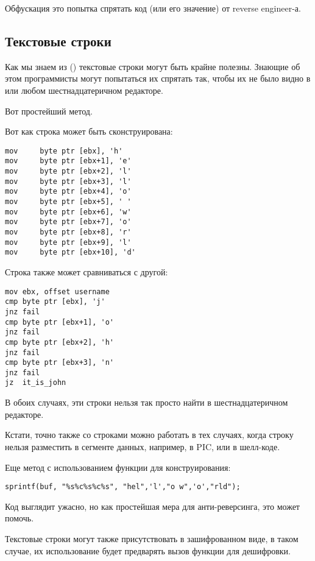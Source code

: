 
Обфускация это попытка спрятать код (или его значение) от reverse engineer-а.

\subsection{Текстовые строки}

Как мы знаем из () текстовые строки могут быть крайне
полезны.
Знающие об этом программисты могут попытаться их спрятать так, чтобы их не было видно в \IDA{} или любом
шестнадцатеричном редакторе.

Вот простейший метод.

Вот как строка может быть сконструирована:

\begin{lstlisting}[style=customasmx86]
mov     byte ptr [ebx], 'h'
mov     byte ptr [ebx+1], 'e'
mov     byte ptr [ebx+2], 'l'
mov     byte ptr [ebx+3], 'l'
mov     byte ptr [ebx+4], 'o'
mov     byte ptr [ebx+5], ' '
mov     byte ptr [ebx+6], 'w'
mov     byte ptr [ebx+7], 'o'
mov     byte ptr [ebx+8], 'r'
mov     byte ptr [ebx+9], 'l'
mov     byte ptr [ebx+10], 'd'
\end{lstlisting}

Строка также может сравниваться с другой:

\begin{lstlisting}[style=customasmx86]
mov	ebx, offset username
cmp	byte ptr [ebx], 'j'
jnz	fail
cmp	byte ptr [ebx+1], 'o'
jnz	fail
cmp	byte ptr [ebx+2], 'h'
jnz	fail
cmp	byte ptr [ebx+3], 'n'
jnz	fail
jz	it_is_john
\end{lstlisting}

В обоих случаях, эти строки нельзя так просто найти в шестнадцатеричном редакторе.

Кстати, точно также со строками можно работать в тех случаях, 
когда строку нельзя разместить в сегменте данных, например, в \ac{PIC}, или в шелл-коде.

Еще метод с использованием функции  для конструирования:

\begin{lstlisting}[style=customc]
sprintf(buf, "%s%c%s%c%s", "hel",'l',"o w",'o',"rld");
\end{lstlisting}

Код выглядит ужасно, но как простейшая мера для анти-реверсинга, это может помочь.

Текстовые строки могут также присутствовать в зашифрованном виде, в таком случае,
их использование будет предварять вызов функции для дешифровки.

